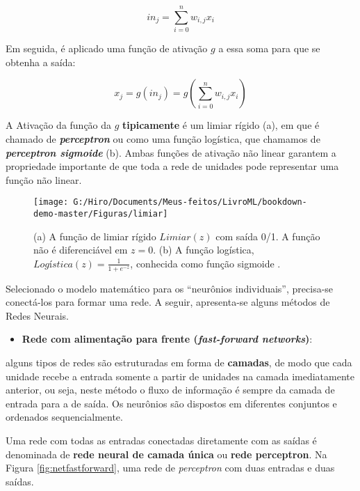 \documentclass[
  openany]{book}
\providecommand{\tightlist}{%
  \setlength{\itemsep}{0pt}\setlength{\parskip}{0pt}}
\begin{document}
\begin{equation} 
  in_j=\displaystyle \sum^n_{i=0} w_{i,j}x_i
  \label{eq:reglinrede}
\end{equation}

Em seguida, é aplicado uma função de ativação \(g\) a essa soma para que se obtenha a saída:

\begin{equation} 
  x_j=g(in_j)=g(\displaystyle \sum^n_{i=0}w_{i,j}x_i)
  \label{eq:funativacao}
\end{equation}

A Ativação da função da \(g\) \textbf{tipicamente} é um limiar rígido (a), em que é chamado de \textbf{\emph{perceptron}} ou como uma função logística, que chamamos de \textbf{\emph{perceptron sigmoide}} (b). Ambas funções de ativação não linear garantem a propriedade importante de que toda a rede de unidades pode representar uma função não linear.

\begin{figure}

{\centering \texttt{[image: G:/Hiro/Documents/Meus-feitos/LivroML/bookdown-demo-master/Figuras/limiar]} 

}

\caption{(a) A função de limiar rígido \(Limiar(z)\) com saída 0/1. A função não é diferenciável em \(z=0\). (b) A função logística, \(Logística(z)=\frac{1}{1+e^{-z}}\), conhecida como função sigmoide \citep{russel2004inteligencia}.}\label{fig:limiar}
\end{figure}



Selecionado o modelo matemático para os ``neurônios individuais'', precisa-se conectá-los para formar uma rede. A seguir, apresenta-se alguns métodos de Redes Neurais.

\begin{itemize}
\tightlist
\item
  \textbf{Rede com alimentação para frente (\emph{fast-forward networks})}:
\end{itemize}

alguns tipos de redes são estruturadas em forma de \textbf{camadas}, de modo que cada unidade recebe a entrada somente a partir de unidades na camada imediatamente anterior, ou seja, neste método o fluxo de informação é sempre da camada de entrada para a de saída. Os neurônios são dispostos em diferentes conjuntos e ordenados sequencialmente.

Uma rede com todas as entradas conectadas diretamente com as saídas é denominada de \textbf{rede neural de camada única} ou \textbf{rede perceptron}. Na Figura \ref{fig:netfastforward}, uma rede de \emph{perceptron} com duas entradas e duas saídas.
\end{document}
